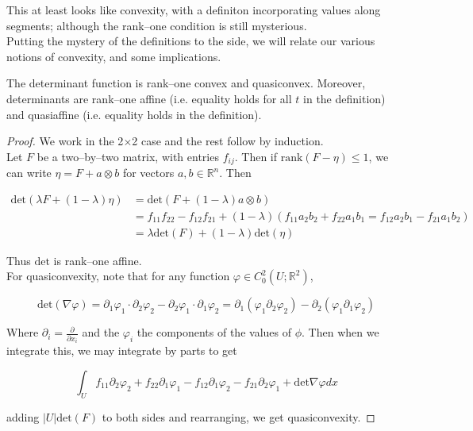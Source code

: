 \documentclass[../main.tex]{subfiles}
\begin{document}
This at least looks like convexity, with a definiton incorporating values along segments; although the rank--one condition is still mysterious. \\

Putting the mystery of the definitions to the side, we will relate our various notions of convexity, and some implications.

\begin{lem}
	The determinant function is rank--one convex and quasiconvex.
	Moreover, determinants are rank--one affine (i.e. equality holds for all $t$ in the definition) and quasiaffine (i.e. equality holds in the definition).
\end{lem}

\begin{proof}
	We work in the 2$\times$2 case and the rest follow by induction. \\

	Let $F$ be a two--by--two matrix, with entries $f_{ij}$.
	Then if $\mathrm{rank}(F - \eta) \leq 1$, we can write $\eta = F + a \otimes b$ for vectors $a,b \in \mathbb{R}^n$.
	Then

	\begin{align*}
		\mathrm{det} ( \lambda F + (1- \lambda) \eta) & = \mathrm{det} ( F + (1-\lambda) a \otimes b)                                                                \\
		                                              & = f_{11} f_{22} - f_{12}f_{21} + (1-\lambda) (f_{11} a_2b_2 + f_{22} a_1b_1 = f_{12} a_2b_1 - f_{21} a_1b_2) \\
		                                              & = \lambda \mathrm{det}(F) + (1-\lambda) \mathrm{det} (\eta)
	\end{align*}

	Thus $\mathrm{det}$ is rank--one affine. \\

	For quasiconvexity, note that for any function $\varphi \in C_0^2( U; \mathbb{R}^2)$,

	\begin{equation*}
		\mathrm{det} ( \nabla \varphi) = \partial_1\varphi_1 \cdot \partial_2\varphi_2 - \partial_2\varphi_1 \cdot \partial_1 \varphi_2 = \partial_1 ( \varphi_1 \partial_2 \varphi_2) - \partial_2 ( \varphi_1 \partial_1 \varphi_2)
	\end{equation*}

	Where $\partial_i = \frac{\partial}{\partial x_i}$ and the $\varphi_i$ the components of the values of $\phi$.
	Then when we integrate this, we may integrate by parts to get

	\begin{equation*}
		\int_U f_{11} \partial_2 \varphi_2 + f_{22} \partial_1 \varphi_1 - f_{12} \partial_1 \varphi_2 - f_{21} \partial_2 \varphi_1 + \mathrm{det} \nabla \varphi dx
	\end{equation*}

	adding $\left| U \right| \mathrm{det} (F)$ to both sides and rearranging, we get quasiconvexity.

\end{proof}
\end{document}
